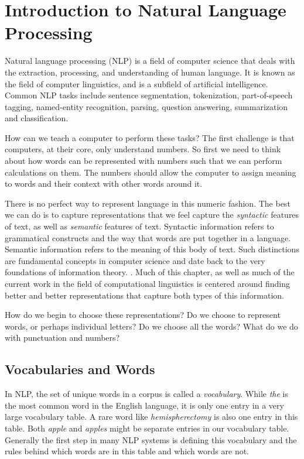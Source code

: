 \section{Introduction to Natural Language Processing}

Natural language processing (NLP) is a field of computer science that deals with the extraction, processing, and understanding of human language.
It is known as the field of computer linguistics, and is a subfield of artificial intelligence.
Common NLP tasks include sentence segmentation, tokenization, part-of-speech tagging, named-entity recognition, parsing, question answering, summarization and classification.

How can we teach a computer to perform these tasks?
The first challenge is that computers, at their core, only understand numbers.
So first we need to think about how words can be represented with numbers such that we can perform calculations on them.
The numbers should allow the computer to assign meaning to words and their context with other words around it.

There is no perfect way to represent language in this numeric fashion. The best we can do is to capture representations that we feel capture the \textit{syntactic} features of text, as well as \textit{semantic} features of text.
Syntactic information refers to grammatical constructs and the way that words are put together in a language. Semantic information refers to the meaning of this body of text. Such distinctions are fundamental concepts in computer science
and date back to the very foundations of information theory. \cite{shannon48}. Much of this chapter, as well as much of the current work in the field of computational linguistics is centered around finding better and better representations that capture both types of this information.

How do we begin to choose these representations? Do we choose to represent words, or perhaps individual letters? Do we choose all the words? What do we do with punctuation and numbers?

\subsection{Vocabularies and Words}
\label{vocabularies_and_words}
In NLP, the set of unique words in a corpus is called a \textit{vocabulary}. While \textit{the} is the most common word in the English language, it is only one entry in a very large vocabulary table. A rare word like \textit{hemispherectomy} is also one
entry in this table. Both \textit{apple} and \textit{apples} might be separate entries in our vocabulary table. Generally the first step in many NLP systems is defining this vocabulary and the rules behind which words are in this table and which words are not.

